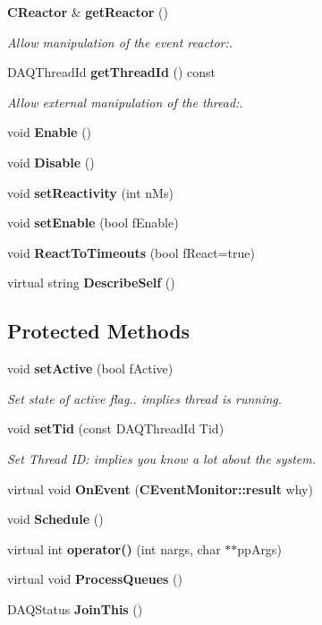 \begin{CompactItemize}
{\bf CReactor} \& {\bf get\-Reactor} ()
\begin{CompactList}\small\item\em Allow manipulation of the event reactor:.\item\end{CompactList}\item 
DAQThread\-Id {\bf get\-Thread\-Id} () const
\begin{CompactList}\small\item\em Allow external manipulation of the thread:.\item\end{CompactList}\item 
void {\bf Enable} ()
\item 
void {\bf Disable} ()
\item 
void {\bf set\-Reactivity} (int n\-Ms)
\item 
void {\bf set\-Enable} (bool f\-Enable)
\item 
void {\bf React\-To\-Timeouts} (bool f\-React=true)
\item 
virtual string {\bf Describe\-Self} ()
\end{CompactItemize}
\subsection*{Protected Methods}
\begin{CompactItemize}
\item 
void {\bf set\-Active} (bool f\-Active)
\begin{CompactList}\small\item\em Set state of active flag.. implies thread is running.\item\end{CompactList}\item 
void {\bf set\-Tid} (const DAQThread\-Id Tid)
\begin{CompactList}\small\item\em Set Thread ID: implies you know a lot about the system.\item\end{CompactList}\item 
virtual void {\bf On\-Event} ({\bf CEvent\-Monitor::result} why)
\item 
void {\bf Schedule} ()
\item 
virtual int {\bf operator()} (int nargs, char $\ast$$\ast$pp\-Args)
\item 
virtual void {\bf Process\-Queues} ()
\item 
DAQStatus {\bf Join\-This} ()
\end{CompactItemize}
